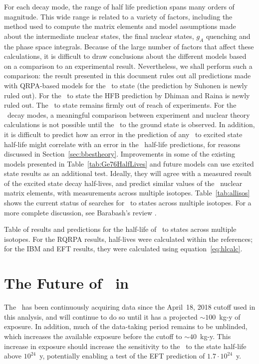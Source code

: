 \documentclass[/main.tex]{subfiles}
\begin{document}
For each decay mode, the range of half life prediction spans many orders of magnitude.
This wide range is related to a variety of factors, including the method used to compute the matrix elements and model assumptions made about the intermediate nuclear states, the final nuclear states, $g_A$ quenching and the phase space integrals.
Because of the large number of factors that affect these calculations, it is difficult to draw conclusions about the different models based on a comparison to an experimental result.
Nevertheless, we shall perform such a comparison: the result presented in this document rules out all predictions made with QRPA-based models for the \tnbb\ to  state (the prediction by Suhonen\cite{gerdaESresult} is newly ruled out).
For the \tnbb\ to  state the HFB prediction by Dhiman and Raina\cite{dhiman1994} is newly ruled out.
The \tnbb\ to  state remains firmly out of reach of experiments.
For the \znbb\ decay modes, a meaningful comparison between experiment and nuclear theory calculations is not possible until the \znbb\ to the ground state is observed.
In addition, it is difficult to predict how an error in the prediction of any \tnbb\ to excited state half-life might correlate with an error in the \znbb\ half-life predictions, for reasons discussed in Section~\ref{sec:bbestheory}.
Improvements in some of the existing models presented in Table~\ref{tab:Ge76HalfLives} and future models can use excited state results as an additional test.
Ideally, they will agree with a measured result of the excited state decay half-lives, and predict similar values of the \znbb\ nuclear matrix elements, with measurements across multiple isotopes.
Table~\ref{tab:allisos} shows the current status of searches for \tnbb\ to  states across multiple isotopes.
For a more complete discussion, see Barabash's review \cite{barabash2017}. 
\begin{table}
  \centering
  \caption[Table of \tnbb\ to  states across multiple isotopes]{\label{tab:allisos}
    Table of results and predictions for the half-life of \tnbb\ to  states across multiple isotopes. For the RQRPA results, half-lives were calculated within the references; for the IBM and EFT results, they were calculated using equation~\ref{eq:hlcalc}.
  }
  
\end{table}

\section{The Future of \bbes\ in }
The \MJD\ has been continuously acquiring data since the April~18, 2018 cutoff used in this analysis, and will continue to do so until it has a projected ${\sim}100$~kg-y of exposure.
In addition, much of the data-taking period remains to be unblinded, which increases the available exposure before the cutoff to ${\sim}40$~kg-y.
This increase in exposure should increase the sensitivity to the \bbes\ to the  state half-life above $10^{24}$~y, potentially enabling a test of the EFT prediction of $1.7\cdot10^{24}$~y\cite{menendez2018}.
\end{document}

